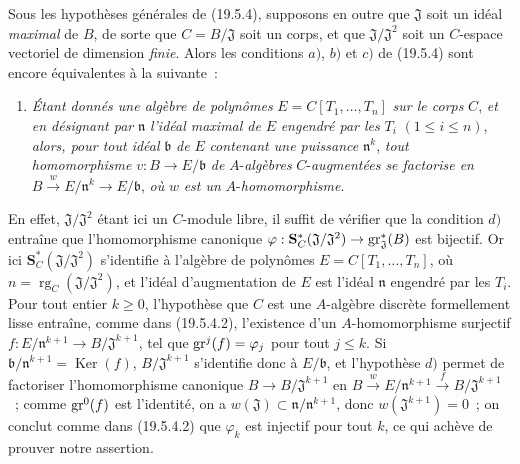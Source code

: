\begin{remark}[19.5.5]
\label{0.19.5.5-fr}
Sous les hypothèses générales de (19.5.4), supposons en outre que
$\mathfrak J$ soit un idéal \emph{maximal} de $B$, de sorte que
$C=B/\mathfrak J$ soit un corps, et que $\mathfrak J/\mathfrak J^2$ soit un
$C$-espace vectoriel de dimension \emph{finie}. Alors les conditions $a)$,
$b)$ et $c)$ de (19.5.4) sont encore équivalentes à la suivante~:
\begin{enumerate}
  \item[d)] \emph{Étant donnés une algèbre de polynômes}
  $E=C[T_1,\ldots,T_n]$ \emph{sur le corps} $C$, \emph{et en désignant par}
  $\mathfrak n$ \emph{l'idéal maximal de} $E$ \emph{engendré par les} $T_i$
  $(1\leq i\leq n)$, \emph{alors, pour tout idéal} $\mathfrak b$ \emph{de}
  $E$ \emph{contenant une puissance} $\mathfrak n^k$, \emph{tout
  homomorphisme} $v:B\to E/\mathfrak b$ \emph{de} $A$-\emph{algèbres}
  $C$-\emph{augmentées se factorise en}
  $B\xrightarrow{w}E/\mathfrak n^k\to E/\mathfrak b$, \emph{où} $w$ \emph{est
  un} $A$-\emph{homomorphisme}.
\end{enumerate}
En effet, $\mathfrak J/\mathfrak J^2$ étant ici un $C$-module libre, il suffit
de vérifier que la condition $d)$ entraîne que l'homomorphisme canonique
$\varphi:\mathbf S_C^*(\mathfrak J/\mathfrak J^2)\to\operatorname{gr}_{\mathfrak J}^*(B)$
est bijectif. Or ici $\mathbf S_C^*(\mathfrak J/\mathfrak J^2)$ s'identifie à
l'algèbre de polynômes $E=C[T_1,\ldots,T_n]$, où
$n=\operatorname{rg}_C(\mathfrak J/\mathfrak J^2)$, et l'idéal d'augmentation
de $E$ est l'idéal $\mathfrak n$ engendré par les $T_i$. Pour tout entier
$k\geq0$, l'hypothèse que $C$ est une $A$-algèbre discrète formellement lisse
entraîne, comme dans (19.5.4.2), l'existence d'un $A$-homomorphisme surjectif
$f:E/\mathfrak n^{k+1}\to B/\mathfrak J^{k+1}$, tel que
$\operatorname{gr}^j(f)=\varphi_j$ pour tout $j\leq k$. Si
$\mathfrak b/\mathfrak n^{k+1}=\operatorname{Ker}(f)$,
$B/\mathfrak J^{k+1}$ s'identifie donc à $E/\mathfrak b$, et l'hypothèse $d)$
permet de factoriser l'homomorphisme canonique $B\to B/\mathfrak J^{k+1}$ en
$B\xrightarrow{w}E/\mathfrak n^{k+1}\xrightarrow{f}B/\mathfrak J^{k+1}$~;
comme $\operatorname{gr}^0(f)$ est l'identité, on a
$w(\mathfrak J)\subset\mathfrak n/\mathfrak n^{k+1}$, donc
$w(\mathfrak J^{k+1})=0$~; on conclut comme dans (19.5.4.2) que $\varphi_k$
est injectif pour tout $k$, ce qui achève de prouver notre assertion.
\end{remark}

